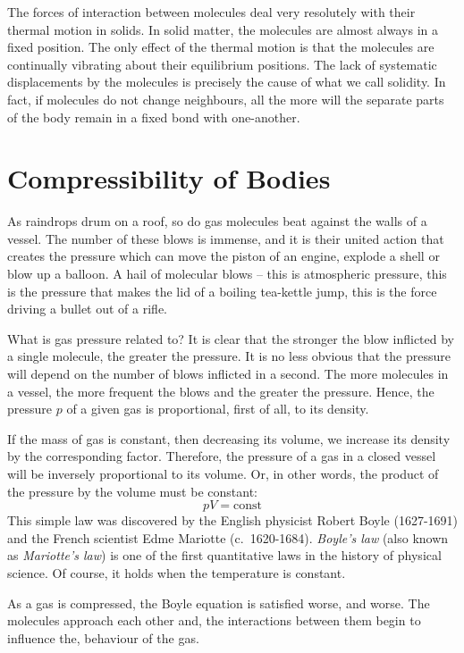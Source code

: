 The forces of interaction between molecules deal very resolutely with their thermal motion in solids. In solid matter, the molecules are almost always in a fixed posi­tion. The only effect of the thermal motion is that the mole­cules are continually vibrating about their equilibrium positions. The lack of systematic displacements by the molecules is precisely the cause of what we call solidity. In fact, if molecules do not change neighbours, all the more will the separate parts of the body remain in a fixed bond with one-another.

\section{Compressibility of Bodies}

As raindrops drum on a roof, so do gas molecules beat against the walls of a vessel. The number of these blows is immense, and it is their united action that creates the pressure which can move the piston of an engine, explode a shell or blow up a balloon. A hail of molecular blows -- this is atmospheric pressure, this is the pressure that makes the lid of a boiling tea-kettle jump, this is the force driving a bullet out of a rifle.

What is gas pressure related to? It is clear that the
stronger the blow inflicted by a single molecule, the greater the pressure. It is no less obvious that the pressure will depend on the number of blows inflicted in a second. The more molecules in a vessel, the more frequent the blows and the greater the pressure. Hence, the pressure $p$ of a given gas is proportional, first of all, to its density.

If the mass of gas is constant, then decreasing its volume, we increase its density by the corresponding factor. Therefore, the pressure of a gas in a closed vessel will be inversely proportional to its volume. Or, in other words, the product of the pressure by the volume must be constant:
\begin{equation*}%
pV = \textrm{const}
\end{equation*}
This simple law was discovered by the English physi­cist Robert Boyle (1627-1691) and the French scientist Edme Mariotte (c.~1620-1684). \emph{Boyle's law} (also known as \emph{Mariotte's law}) is one of the first quantitative laws in the history of physical science. Of course, it holds when the temperature is constant.

As a gas is compressed, the Boyle equation is satisfied worse, and worse. The molecules approach each other and, the interactions between them begin to influence the, behaviour of the gas.

